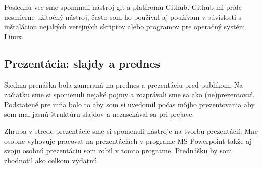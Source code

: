 \documentclass[10pt,oneside,slovak,a4paper]{article}
\begin{document}
Poslednú vec sme spomínali nástroj git a platfromu Github. Github mi príde nesmierne užitočný nástroj, často som ho používal aj používam v súvislosti s inštaláciou nejakých verejných skriptov alebo programov pre operačný systém Linux.

\subsection{Prezentácia: slajdy a prednes}

Siedma prenáška bola zameraná na prednes a prezentáciu pred publikom. Na začiatku sme si spomenuli nejaké pojmy a rozprávali sme sa ako (ne)prezentovať. Podstatené pre mňa bolo to aby som si uvedomil počas môjho prezentovania aby som mal jasnú štruktúru slajdov a nezasekával sa pri prejave.

Zhruba v strede prezentácie sme si spomenuli  nástroje na tvorbu prezentácií. Mne osobne vyhovuje pracovať na prezentáciách v programe MS Powerpoint takže aj svoju osobnú prezentáciu som robil v tomto programe. Prednášku by som zhodnotil ako celkom výdatnú.



\end{document}
